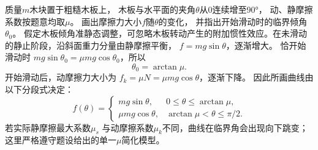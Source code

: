 \problemtext 质量$m$木块置于粗糙木板上，
木板与水平面的夹角$\theta$从0连续增至90°，
动、静摩擦系数按题意均取$\mu$。
画出摩擦力大小$f$随$\theta$的变化，
并指出开始滑动时的临界倾角$\theta_0$。
\workings
假定木板倾角准静态调整，可忽略木板转动产生的附加惯性效应。在未滑动的静止阶段，沿斜面重力分量由静摩擦平衡，
$f=mg\sin\theta$，逐渐增大。
恰开始滑动时
$mg\sin\theta_0=\mu mg\cos\theta_0$，所以
\[
\boxed{\theta_0=\arctan\mu}.
\]
开始滑动后，动摩擦力大小为
$f_k=\mu N=\mu mg\cos\theta$，逐渐下降。
因此所画曲线由以下分段式决定：
\[
\boxed{
f(\theta)=
\begin{cases}
mg\sin\theta,&0\le\theta\le\arctan\mu,\\
\mu mg\cos\theta,&\arctan\mu<\theta\le\pi/2.
\end{cases}}
\]
\crosscheck 若实际静摩擦最大系数$\mu_s$
与动摩擦系数$\mu_k$不同，曲线在临界角会出现向下跳变；
这里严格遵守题设给出的单一$\mu$简化模型。
